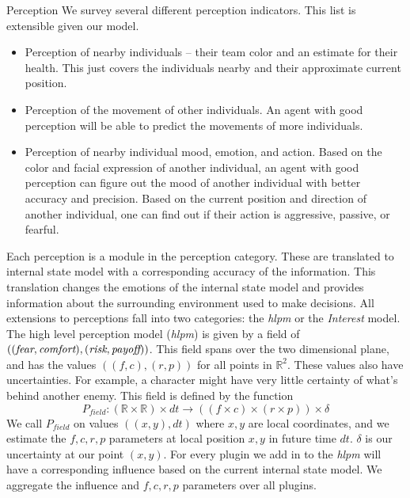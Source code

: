 \documentclass[11pt]{article}
\begin{document}
\begin{section}{Perception}
We survey several different perception indicators. This list is extensible given our model.
\begin{itemize}
\item Perception of nearby individuals -- their team color and an estimate for their health. This just covers the individuals nearby and their approximate current position.
\item Perception of the movement of other individuals. An agent with good perception will be able to predict the movements of more individuals.
\item Perception of nearby individual mood, emotion, and action. Based on the color and facial expression of another individual, an agent with good perception can figure out the mood of another individual with better accuracy and precision. Based on the current position and direction of another individual, one can find out if their action is aggressive, passive, or fearful. 
\end{itemize}
Each perception is a module in the perception category. These are translated to internal state model with a corresponding accuracy of the information. This translation changes the emotions of the internal state model and provides information about the surrounding environment used to make decisions. All extensions to perceptions fall into two categories: the \emph{hlpm} or the \emph{Interest} model.  \\

The high level perception model (\emph{hlpm}) is given by a field of $((\emph{fear}, \emph{comfort}),\\ (\emph{risk}, \emph{payoff}))$. This field spans over the two dimensional plane, and has the values $((f, c), (r, p))$ for all points in $\mathbb{R}^2$. These values also have uncertainties. For example, a character might have very little certainty of what's behind another enemy. This field is defined by the function
\[P_{field} : (\mathbb{R}\times\mathbb{R})\times dt \rightarrow  ((f \times c) \times (r \times p)) \times \delta \]
We call $P_{field}$ on values $((x, y), dt)$ where $x, y$ are local coordinates, and we estimate the $f, c, r, p$ parameters at local position $x, y$ in future time $dt$. $\delta$ is our uncertainty at our point $(x, y)$. For every plugin we add in to the \emph{hlpm} will have a corresponding influence based on the current internal state model. We aggregate the influence and $f, c, r, p$ parameters over all plugins.\\


\end{section}
\end{document}
